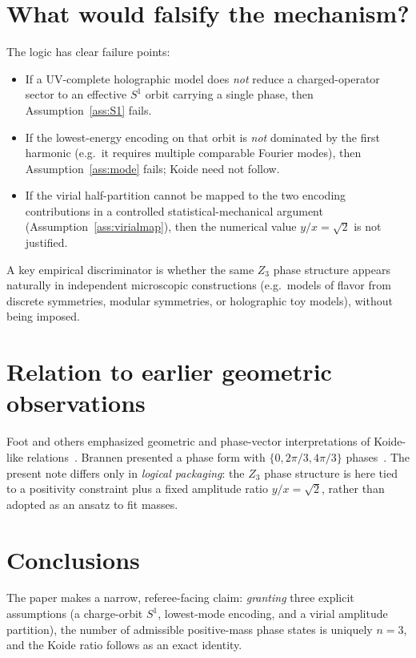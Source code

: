 \documentclass[12pt,a4paper]{article}
\begin{document}
\section{What would falsify the mechanism?}
\label{sec:falsify}

The logic has clear failure points:

\begin{itemize}
\item If a UV-complete holographic model does \emph{not} reduce a charged-operator sector to an effective $S^1$ orbit carrying a single phase, then Assumption~\ref{ass:S1} fails.
\item If the lowest-energy encoding on that orbit is \emph{not} dominated by the first harmonic (e.g.\ it requires multiple comparable Fourier modes), then Assumption~\ref{ass:mode} fails; Koide need not follow.
\item If the virial half-partition cannot be mapped to the two encoding contributions in a controlled statistical-mechanical argument (Assumption~\ref{ass:virialmap}), then the numerical value $y/x=\sqrt{2}$ is not justified.
\end{itemize}

A key empirical discriminator is whether the same $Z_3$ phase structure appears naturally in independent microscopic constructions (e.g.\ models of flavor from discrete symmetries, modular symmetries, or holographic toy models), without being imposed.

\section{Relation to earlier geometric observations}
\label{sec:relation}

Foot and others emphasized geometric and phase-vector interpretations of Koide-like relations~\cite{foot1994}.
Brannen presented a phase form with $\{0,2\pi/3,4\pi/3\}$ phases~\cite{brannen2006}.
The present note differs only in \emph{logical packaging}: the $Z_3$ phase structure is here tied to a positivity constraint plus a fixed amplitude ratio $y/x=\sqrt{2}$, rather than adopted as an ansatz to fit masses.

\section{Conclusions}
\label{sec:concl}

The paper makes a narrow, referee-facing claim:
\emph{granting} three explicit assumptions (a charge-orbit $S^1$, lowest-mode encoding, and a virial amplitude partition), the number of admissible positive-mass phase states is uniquely $n=3$, and the Koide ratio follows as an exact identity.
\end{document}
